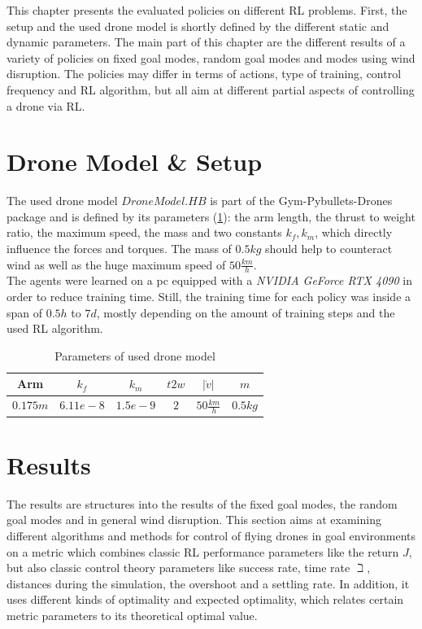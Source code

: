 This chapter presents the evaluated policies on different RL problems. 
First, the setup and the used drone model is shortly defined by the different static and dynamic parameters. 
The main part of this chapter are the different results of a variety of policies on fixed goal modes, random goal modes and modes using wind disruption. 
The policies may differ in terms of actions, type of training, control frequency and RL algorithm, but all aim at different partial aspects of controlling a drone via RL.

\section{Drone Model \& Setup}
The used drone model $DroneModel.HB$ is part of the Gym-Pybullets-Drones package and is defined by its parameters (\cref{tab:drone}): 
the arm length, the thrust to weight ratio, the maximum speed, the mass and two constants $k_f, k_m$, which directly influence the forces and torques.
The mass of $0.5kg$ should help to counteract wind as well as the huge maximum speed of $50 \frac{km}{h}$.\\
The agents were learned on a pc equipped with a \emph{NVIDIA GeForce RTX 4090} in order to reduce training time. 
Still, the training time for each policy was inside a span of $0.5h$ to $7d$, 
mostly depending on the amount of training steps and the used RL algorithm.

\begin{table}
	\centering
	\caption{Parameters of used drone model}\label{tab:drone}
	\begin{tabular}{|c|c|c|c|c|c|}
		\hline
		Arm & $k_f$& $k_m$ & $t2w$ & $|\dot{v}|$ & $m$ \\
		\hline
		$0.175m$ & $6.11e-8$ & $1.5e-9$ & $2$ & $50 \frac{km}{h}$ & $0.5 kg$\\
		\hline
	\end{tabular}
\end{table}


\section{Results}
The results are structures into the results of the fixed goal modes, the random goal modes and in general wind disruption. 
This section aims at examining different algorithms and methods for control of flying drones in goal environments 
on a metric which combines classic RL performance parameters like the return $J$, but also classic control theory parameters like 
success rate, time rate $\beth$, distances during the simulation, the overshoot and a settling rate. 
In addition, it uses different kinds of optimality and expected optimality, 
which relates certain metric parameters to its theoretical optimal value.

